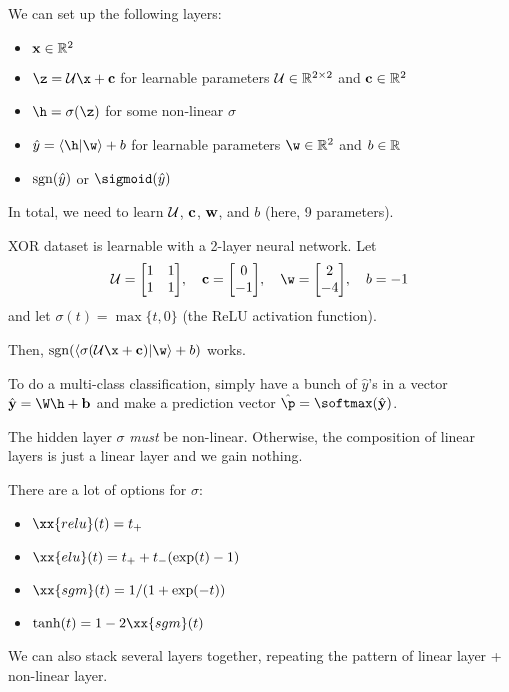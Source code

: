 \documentclass[class=cs480,notes,tikz]{agony}
\begin{document}
We can set up the following layers:
\begin{itemize}[nosep]
  \item {} $\vb x \in \mathbb{R}^2$
  \item {} $\z = \U\x + \vb c$ for learnable parameters $\mathcal{U} \in \mathbb{R}^{2\times 2}$ and $\vb c \in \mathbb{R}^2$
  \item {} $\h = \sigma(\z)$ for some non-linear $\sigma$
  \item {} $\hat y = \ip{\h}{\w} + b$ for learnable parameters $\w \in \R^2$ and $b \in \mathbb{R}$
  \item {} $\operatorname{sgn}(\hat y)$ or $\sigmoid(\hat y)$
\end{itemize}
In total, we need to learn $\mathcal{U}$, $\vb c$, $\vb w$, and $b$ (here, 9 parameters).

\begin{example}
  XOR dataset is learnable with a 2-layer neural network. Let
  \[ \U = \mqty[1&1\\1&1] \qc \vb c = \mqty[0\\-1] \qc \w = \mqty[2\\-4] \qc b = -1 \]
  and let $\sigma(t) = \max\{t,0\}$ (the ReLU activation function).

  Then, $\sgn(\ip{\sigma(\U\x+\vb c)}{\w} + b)$ works.
\end{example}

To do a multi-class classification, simply have a bunch of $\hat y$'s in a vector
$\hat{\vb y} = \W\h + \vb b$ and make a prediction vector $\hat{\p} = \softmax(\hat{\vb y})$.

\begin{remark}
  The hidden layer $\sigma$ \emph{must} be non-linear.
  Otherwise, the composition of linear layers is just a linear layer and we gain nothing.
\end{remark}

There are a lot of options for $\sigma$:
\begin{itemize}[nosep]
  \item $\xx{relu}(t) = t_+$
  \item $\xx{elu}(t) = t_+ + t_-(\exp(t)-1)$
  \item $\xx{sgm}(t) = 1/(1+\exp(-t))$
  \item $\tanh(t) = 1-2\xx{sgm}(t)$
\end{itemize}

We can also stack several layers together,
repeating the pattern of linear layer + non-linear layer.
\end{document}
